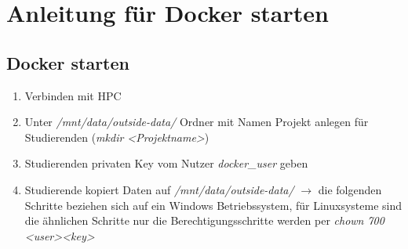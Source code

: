 \chapter{Anleitung für Docker starten}
\section{Docker starten}
\begin{enumerate}
    \item Verbinden mit HPC 
    \item Unter \textit{/mnt/data/outside-data/} Ordner mit Namen Projekt anlegen für Studierenden (\textit{mkdir \textless Projektname\textgreater}) 
    \item Studierenden privaten Key vom Nutzer \textit{docker\_user} geben
    \item Studierende kopiert Daten auf \textit{/mnt/data/outside-data/} $\rightarrow$ die folgenden Schritte beziehen sich auf ein Windows Betriebssystem, für Linuxsysteme sind die ähnlichen Schritte nur die Berechtigungsschritte werden per \textit{chown 700 \textless user\textgreater \textless key\textgreater}
    

\end{enumerate}
